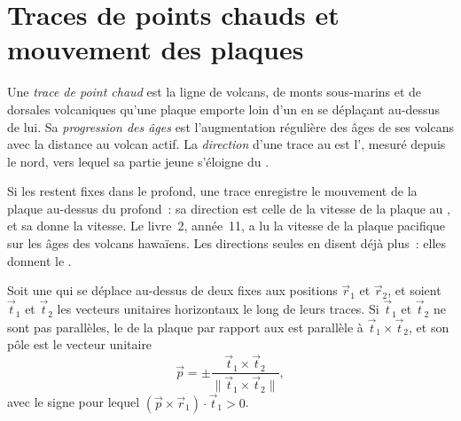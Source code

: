\section{Traces de points chauds et mouvement des plaques}\label{sec:b1:hotspots:tracks}

\begin{definition}\label{def:b1:hotspots:track}
Une \emph{trace de point chaud} est la ligne de volcans, de monts sous-marins
et de dorsales volcaniques qu'une plaque emporte loin d'un  en se déplaçant au-dessus
de lui. Sa \emph{progression des âges} est l'augmentation régulière
des âges de ses volcans avec la distance au volcan actif. La
\emph{direction} d'une trace au  est l', mesuré depuis le nord,
vers lequel sa partie jeune s'éloigne du .
\end{definition}

Si les  restent fixes dans le  profond, une trace enregistre le mouvement de la
plaque au-dessus du  profond~: sa direction est celle de la vitesse de la plaque au
, et sa  donne la vitesse. Le livre~2, année~11, a lu la
vitesse de la plaque pacifique sur les âges des volcans hawaïens. Les
directions seules en disent déjà plus~: elles donnent le .

\begin{proposition}\label{prop:b1:hotspots:two-tracks}
Soit une  qui se déplace au-dessus de deux  fixes aux positions $\vec r_1$ et
$\vec r_2$, et soient $\vec t_1$ et $\vec t_2$ les vecteurs unitaires horizontaux
le long de leurs traces. Si $\vec t_1$ et $\vec t_2$ ne sont pas parallèles, le  de la plaque par rapport aux  est parallèle à
$\vec t_1\times\vec t_2$, et son pôle est le vecteur unitaire
\[
  \vec p = \pm\frac{\vec t_1\times\vec t_2}{\lVert\vec t_1\times\vec t_2\rVert},
\]
avec le signe pour lequel $(\vec p\times\vec r_1)\cdot\vec t_1 > 0$.
\end{proposition}

